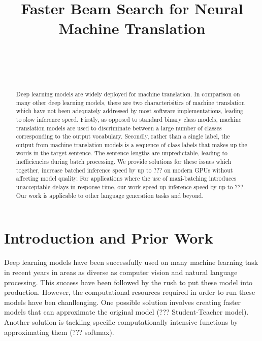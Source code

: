 \documentclass[]{article}
\begin{document}
\title{\bf Faster Beam Search for Neural Machine Translation}  

\author{ \hfill  {}\\ 
        \addr{}
\AND
        \hfill {}\\
\AND
        \hfill {}\\
}

\maketitle
\pagestyle{empty}

\begin{abstract}

Deep learning models are widely deployed for machine translation. In comparison on many other deep learning models, there are two characterisitics of machine translation which have not been adequately addressed by most software implementations, leading to slow inference speed. Firstly, as opposed to standard binary class models, machine translation models are used to discriminate between a large number of classes corresponding to the output vocabulary. Secondly, rather than a single label, the output from machine translation models is a sequence of class labels that makes up the words in the target sentence. The sentence lengths are unpredictable, leading to inefficiencies during batch processing. We provide solutions for these issues which together, increase batched inference speed by up to ??? on modern GPUs without affecting model quality. For applications where the use of maxi-batching introduces unacceptable delays in response time, our work speed up inference speed by up to ???. Our work is applicable to other language generation tasks and beyond.

\end{abstract}

\section{Introduction and Prior Work}

Deep learning models have been successfully used on many machine learning task in recent years in areas as diverse as computer vision and natural language processing. This success have been followed by the rush to put these model into production. However, the computational resources required in order to run these models have ben chanllenging. One possible solution involves creating faster models that can approximate the original model (??? Student-Teacher model). Another solution is tackling specific computationally intensive functions by approximating them (??? softmax). 
\end{document}
